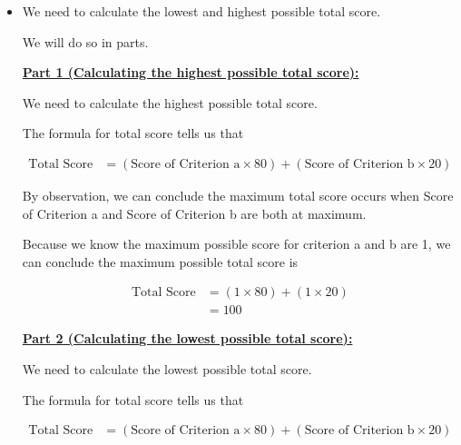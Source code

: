 \documentclass[12pt]{article}
\begin{document}
\begin{itemize}
    \item

    We need to calculate the lowest and highest possible total score.

    \bigskip

    We will do so in parts.

    \bigskip

    \underline{\textbf{Part 1 (Calculating the highest possible total score):}}

    \bigskip

    We need to calculate the highest possible total score.

    \bigskip

    The formula for total score tells us that

    \setcounter{equation}{0}
    \begin{align}
        \text{Total Score} &= (\text{Score of Criterion a} \times 80) + (\text{Score of Criterion b} \times 20)
    \end{align}

    \bigskip

    By observation, we can conclude the maximum total score occurs when Score of Criterion a
    and Score of Criterion b are both at maximum.

    \bigskip

    Because we know the maximum possible score for criterion a and b are 1,
    we can conclude the maximum possible total score is

    \begin{align}
        \text{Total Score} &= (1 \times 80) + (1 \times 20)\\
        &= 100
    \end{align}

    \bigskip

    \underline{\textbf{Part 2 (Calculating the lowest possible total score):}}

    \bigskip

    We need to calculate the lowest possible total score.

    \bigskip

    The formula for total score tells us that

    \begin{align}
        \text{Total Score} &= (\text{Score of Criterion a} \times 80) + (\text{Score of Criterion b} \times 20)
    \end{align}


\end{itemize}
\end{document}
